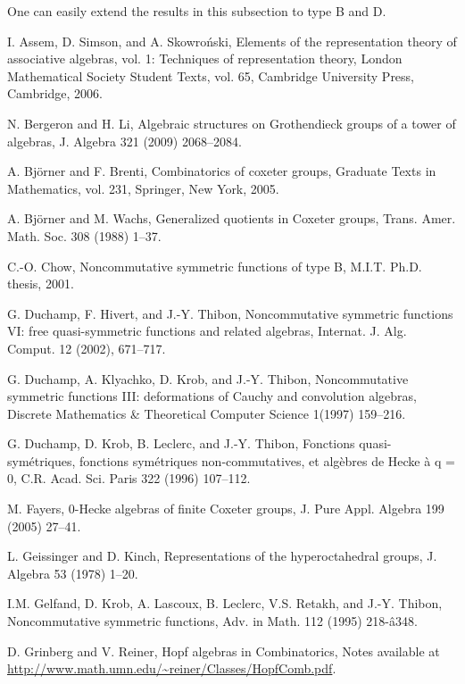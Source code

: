\documentclass{amsart}
\newtheorem*{Young's Rule}{Young's Rule}
\theoremstyle{definition}
\theoremstyle{remark}
\numberwithin{equation}{section}
\begin{document}
One can easily extend the results in this subsection to type B and D.

\begin{thebibliography}{30}

I. Assem, D. Simson, and A. Skowro\'nski, Elements of the representation theory of associative algebras, vol. 1: Techniques of representation theory, London Mathematical Society Student Texts, vol. 65, Cambridge University Press, Cambridge, 2006.

N. Bergeron and H. Li, Algebraic structures on Grothendieck groups of a tower of algebras, J. Algebra 321 (2009) 2068--2084.

A. Bj\"orner and F. Brenti, Combinatorics of coxeter groups, Graduate Texts in Mathematics, vol. 231, Springer, New York, 2005.

A. Bj\"orner and M. Wachs, Generalized quotients in Coxeter groups,  Trans. Amer. Math. Soc. 308 (1988) 1--37. 

C.-O. Chow, Noncommutative symmetric functions of type B, M.I.T. Ph.D. thesis, 2001.

G. Duchamp, F. Hivert, and J.-Y. Thibon, Noncommutative symmetric functions VI: free quasi-symmetric functions and related algebras, Internat. J. Alg. Comput. 12 (2002), 671--717.

G. Duchamp, A. Klyachko, D. Krob, and J.-Y. Thibon, Noncommutative symmetric functions III: deformations of Cauchy and convolution algebras, Discrete Mathematics \& Theoretical Computer Science 1(1997) 159--216.

G. Duchamp, D. Krob, B. Leclerc, and J.-Y. Thibon, Fonctions quasi-sym\'etriques, fonctions sym\'etriques non-commutatives, et alg\`ebres de Hecke \`a q = 0, C.R. Acad. Sci. Paris 322 (1996) 107--112.

M. Fayers, 0-Hecke algebras of finite Coxeter groups, J. Pure Appl. Algebra
199 (2005) 27--41.

L. Geissinger and D. Kinch, Representations of the hyperoctahedral groups, J. Algebra 53 (1978) 1--20.

I.M. Gelfand, D. Krob, A. Lascoux, B. Leclerc, V.S. Retakh, and J.-Y. Thibon, Noncommutative symmetric functions, Adv. in Math. 112 (1995) 218-â348.

D. Grinberg and V. Reiner, Hopf algebras in Combinatorics, Notes available at \url{http://www.math.umn.edu/~reiner/Classes/HopfComb.pdf}.


\end{thebibliography}
\end{document}
